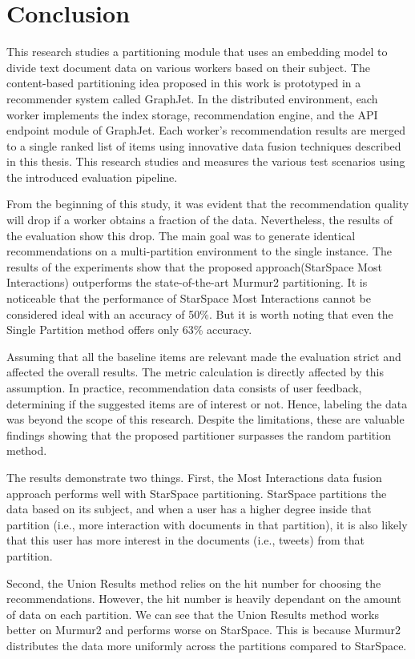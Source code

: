 \chapter{Conclusion}

This research studies a partitioning module that uses an embedding model to divide text document data on various workers based on their subject. The content-based partitioning idea proposed in this work is prototyped in a recommender system called GraphJet. In the distributed environment, each worker implements the index storage, recommendation engine, and the API endpoint module of GraphJet. Each worker's recommendation results are merged to a single ranked list of items using innovative data fusion techniques described in this thesis. This research studies and measures the various test scenarios using the introduced evaluation pipeline.


From the beginning of this study, it was evident that the recommendation quality will drop if a worker obtains a fraction of the data. Nevertheless, the results of the evaluation show this drop. The main goal was to generate identical recommendations on a multi-partition environment to the single instance. The results of the experiments show that the proposed approach(StarSpace Most Interactions) outperforms the state-of-the-art Murmur2 partitioning. It is noticeable that the performance of StarSpace Most Interactions cannot be considered ideal with an accuracy of 50\%. But it is worth noting that even the Single Partition method offers only 63\% accuracy.


Assuming that all the baseline items are relevant made the evaluation strict and affected the overall results. The metric calculation is directly affected by this assumption. In practice, recommendation data consists of user feedback, determining if the suggested items are of interest or not. Hence, labeling the data was beyond the scope of this research. Despite the limitations, these are valuable findings showing that the proposed partitioner surpasses the random partition method.


The results demonstrate two things. First, the Most Interactions data fusion approach performs well with StarSpace partitioning. StarSpace partitions the data based on its subject, and when a user has a higher degree inside that partition (i.e., more interaction with documents in that partition), it is also likely that this user has more interest in the documents (i.e., tweets) from that partition. 

Second, the Union Results method relies on the hit number for choosing the recommendations. However, the hit number is heavily dependant on the amount of data on each partition. We can see that the Union Results method works better on Murmur2 and performs worse on StarSpace. This is because Murmur2 distributes the data more uniformly across the partitions compared to StarSpace.


